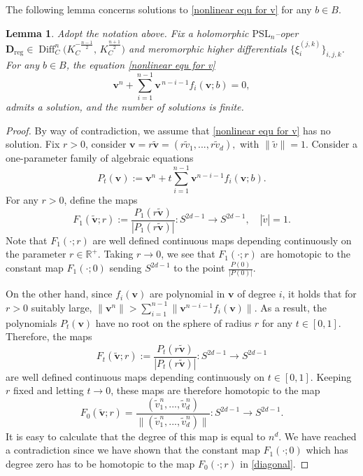\documentclass[twoside, 11pt]{article}
\numberwithin{equation}{section}
\theoremstyle{theorem}
\numberwithin{theorem}{section}
\newtheorem{lemma}[lemma]{Lemma}
\theoremstyle{definition}
\begin{document}
The following lemma concerns solutions to \eqref{nonlinear equ for v} for any $b\in B$.
\begin{lemma}\label{l:solve nonlinear equ}
    Adopt the notation above. Fix a holomorphic $\mathrm{PSL}_n$--oper
\(
\mathbf D_{\mathrm{reg}} \in \operatorname{Diff}_C^{n}\bigl(K_C^{-\frac{n-1}{2}},\,K_C^{\frac{n+1}{2}}\bigr)
\)
and meromorphic higher differentials $\{ \xi_i^{(j,k)} \}_{i,j,k}$. For any $b\in B$, the equation \eqref{nonlinear equ for v}
$$
\boldsymbol v^n+\sum_{i=1}^{n-1}\boldsymbol v^{\,n-i-1} f_i(\boldsymbol v;b)=0,
$$
admits a solution, and the number of solutions is finite.
\end{lemma}

\begin{proof}
By way of contradiction, we assume that \eqref{nonlinear equ for v} has no solution. 
Fix $r>0$, consider 
\(
\boldsymbol{v} = r\boldsymbol{\tilde v} = (r\tilde v_1,...,r\tilde v_d),
\)
with $\|\tilde v \| =1$.
Consider a one-parameter family of algebraic equations
\[
P_t(\boldsymbol{ v}) := \boldsymbol{v}^n + t\sum_{i=1}^{n-1} \boldsymbol{v}^{n-i-1} f_{i}(\boldsymbol{v};b). 
\]
For any $r>0$,  define the maps 
\begin{equation}\label{homotopy_1}
F_1(\boldsymbol{\tilde v};r) := \frac{P_1(r\boldsymbol{ \tilde v})}{|P_1(r\boldsymbol{\tilde v})|} : S^{2d-1} \to S^{2d-1}, \quad |\tilde v|=1.
\end{equation}
Note that $F_1(\cdot;r)$ are well defined continuous maps depending continuously on the parameter $r \in \mathbb R^+$. Taking $r\to 0$, we see that $F_1(\cdot;r)$ are homotopic to the constant map $F_1(\cdot;0)$ sending $S^{2d-1}$ to the point $\frac{P(0)}{|P(0)|}$.

On the other hand, since $f_i(\boldsymbol{v})$ are polynomial in $\boldsymbol{v}$ of degree $i$, it holds that for $r>0$ suitably large, 
\(
\|\boldsymbol{v}^n\| > \sum_{i=1}^{n-1} \|\boldsymbol{v}^{n-i-1} f_{i}(\boldsymbol{v})\|.
\)
As a result, the polynomials $P_t(\boldsymbol{ v})$ have no root on the sphere of radius $r$ for any $t\in[0,1]$. Therefore, the maps 
\begin{equation}\label{homotopy_2}
F_{t}(\boldsymbol{\tilde v};r) := \frac{P_t(r\boldsymbol{ \tilde v})}{|P_t(r\boldsymbol{ \tilde v})|} : S^{2d-1} \to S^{2d-1}
\end{equation}
are well defined continuous maps depending continuously on $t\in[0,1]$. Keeping $r$ fixed and letting $t\to 0$, these maps are therefore homotopic to the map 
\begin{equation}\label{diagonal}
F_{0}(\boldsymbol{\tilde v};r)=\frac{(\tilde v_1^n,...,\tilde v_d^n)}{\|(\tilde v_1^n,...,\tilde v_d^n)\|} : S^{2d-1} \to S^{2d-1}.
\end{equation}
It is easy to calculate that the degree of this map is equal to $n^d$. We have reached a contradiction since we have shown that the constant map $F_1(\cdot;0)$ which has degree zero has to be homotopic to the map $F_{0}(\cdot;r)$ in \eqref{diagonal}. 


\end{proof}
\end{document}
